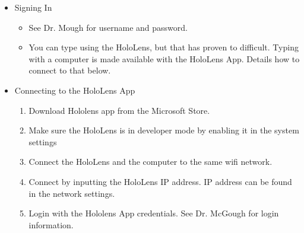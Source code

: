 \begin{itemize}
    \item Signing In
        \begin{itemize}
            \item See Dr. Mough for username and password. 

            \item You can type using the HoloLens, but that has proven to difficult. Typing with a computer is made available with the HoloLens App. Details how to connect to that below.
        \end{itemize}

    \item Connecting to the HoloLens App
        \begin{enumerate}
            \item Download Hololens app from the Microsoft Store.
            \item Make sure the HoloLens is in developer mode by enabling it in the system settings
            \item Connect the HoloLens and the computer to the same wifi network.
            \item Connect by inputting the HoloLens IP address. IP address can be found in the network settings.
            \item Login with the Hololens App credentials. See Dr. McGough for login information.
        \end{enumerate}

\end{itemize}

